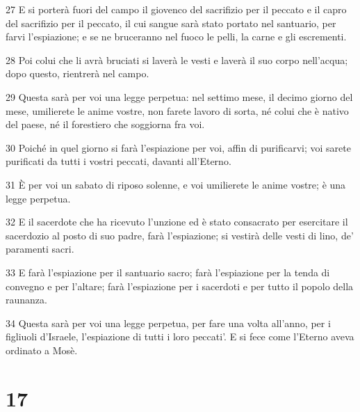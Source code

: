 \par 27 E si porterà fuori del campo il giovenco del sacrifizio per il peccato e il capro del sacrifizio per il peccato, il cui sangue sarà stato portato nel santuario, per farvi l'espiazione; e se ne bruceranno nel fuoco le pelli, la carne e gli escrementi.
\par 28 Poi colui che li avrà bruciati si laverà le vesti e laverà il suo corpo nell'acqua; dopo questo, rientrerà nel campo.
\par 29 Questa sarà per voi una legge perpetua: nel settimo mese, il decimo giorno del mese, umilierete le anime vostre, non farete lavoro di sorta, né colui che è nativo del paese, né il forestiero che soggiorna fra voi.
\par 30 Poiché in quel giorno si farà l'espiazione per voi, affin di purificarvi; voi sarete purificati da tutti i vostri peccati, davanti all'Eterno.
\par 31 È per voi un sabato di riposo solenne, e voi umilierete le anime vostre; è una legge perpetua.
\par 32 E il sacerdote che ha ricevuto l'unzione ed è stato consacrato per esercitare il sacerdozio al posto di suo padre, farà l'espiazione; si vestirà delle vesti di lino, de' paramenti sacri.
\par 33 E farà l'espiazione per il santuario sacro; farà l'espiazione per la tenda di convegno e per l'altare; farà l'espiazione per i sacerdoti e per tutto il popolo della raunanza.
\par 34 Questa sarà per voi una legge perpetua, per fare una volta all'anno, per i figliuoli d'Israele, l'espiazione di tutti i loro peccati'. E si fece come l'Eterno aveva ordinato a Mosè.

\chapter{17}

